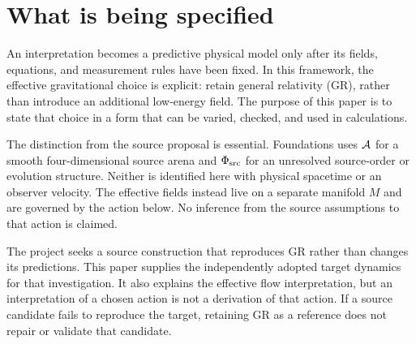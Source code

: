 \documentclass[11pt]{article}
\begin{document}

\section{What is being specified}
An interpretation becomes a predictive physical model only after its fields, equations, and measurement rules have been fixed. In this framework, the effective gravitational choice is explicit: retain general relativity (GR), rather than introduce an additional low-energy \Aflow{} field. The purpose of this paper is to state that choice in a form that can be varied, checked, and used in calculations.

The distinction from the source proposal is essential. Foundations uses $\mathcal A$ for a smooth four-dimensional source arena and $\Phi_{\mathrm{src}}$ for an unresolved source-order or evolution structure. Neither is identified here with physical spacetime or an observer velocity. The effective fields instead live on a separate manifold $M$ and are governed by the action below. No inference from the source assumptions to that action is claimed.

The project seeks a source construction that reproduces GR rather than changes its predictions. This paper supplies the independently adopted target dynamics for that investigation. It also explains the effective flow interpretation, but an interpretation of a chosen action is not a derivation of that action. If a source candidate fails to reproduce the target, retaining GR as a reference does not repair or validate that candidate.
\end{document}
